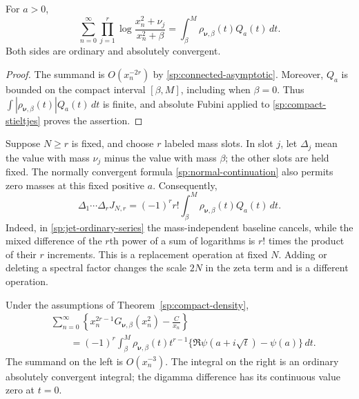 \begin{corollary}
\label{sp:ordinary-connected}
For $a>0$,
\begin{equation}
 \sum_{n=0}^{\infty}
   \prod_{j=1}^{r}\log\frac{x_n^2+\nu_j}{x_n^2+\beta}
 =\int_\beta^M\rho_{\boldsymbol\nu,\beta}(t)Q_a(t)\,dt.
 \label{sp:connected-sum}
\end{equation}
Both sides are ordinary and absolutely convergent.
\end{corollary}

\begin{proof}
The summand is $O(x_n^{-2r})$ by
\eqref{sp:connected-asymptotic}.  Moreover, $Q_a$ is bounded on
the compact interval $[\beta,M]$, including when $\beta=0$.
Thus $\int|\rho_{\boldsymbol\nu,\beta}(t)|Q_a(t)\,dt$ is finite,
and absolute Fubini applied to
\eqref{sp:compact-stieltjes} proves the assertion.
\end{proof}

\begin{remark}
\label{sp:fixed-N-differences}
Suppose $N\geq r$ is fixed, and choose $r$ labeled mass slots.
In slot $j$, let $\Delta_j$ mean the value with mass $\nu_j$
minus the value with mass $\beta$; the other slots are held
fixed.  The normally convergent formula
\eqref{sp:normal-continuation} also permits zero masses at this
fixed positive $a$.  Consequently,
\begin{equation}
 \Delta_1\cdots\Delta_r J_{N,r}
 =(-1)^r r!\int_\beta^M
                    \rho_{\boldsymbol\nu,\beta}(t)Q_a(t)\,dt.
 \label{sp:connected-finite-difference}
\end{equation}
Indeed, in \eqref{sp:jet-ordinary-series} the mass-independent
baseline cancels, while the mixed difference of the $r$th power
of a sum of logarithms is $r!$ times the product of their $r$
increments.  This is a replacement operation at fixed $N$.
Adding or deleting a spectral factor changes the scale $2N$ in
the zeta term and is a different operation.
\end{remark}

\begin{theorem}
\label{sp:critical-weight}
Under the assumptions of Theorem~\ref{sp:compact-density},
\begin{equation}
 \boxed{\begin{aligned}
 &\sum_{n=0}^{\infty}\left\{
        x_n^{2r-1}G_{\boldsymbol\nu,\beta}(x_n^2)-\frac{C}{x_n}
                         \right\}\\
 &\qquad=(-1)^r\int_\beta^M
       \rho_{\boldsymbol\nu,\beta}(t)t^{r-1}
       \{\Re\psi(a+i\sqrt t)-\psi(a)\}\,dt.
 \end{aligned}}
 \label{sp:critical-ordinary-sum}
\end{equation}
The summand on the left is $O(x_n^{-3})$.  The integral on the
right is an ordinary absolutely convergent integral; the
digamma difference has its continuous value zero at $t=0$.
\end{theorem}

